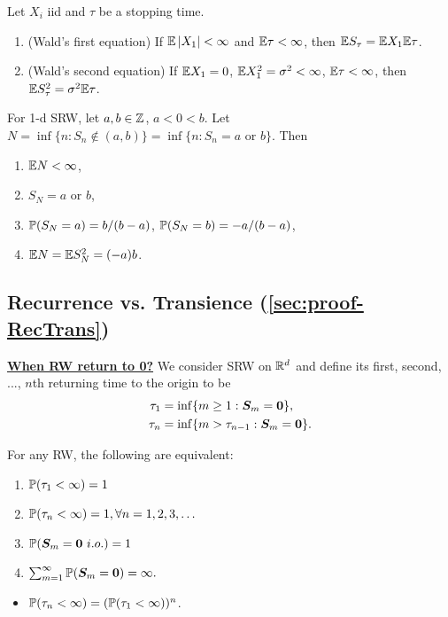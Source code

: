 \documentclass[10pt,a4paper]{article}
\begin{document}
\begin{thmbox}
	\begin{theorem}\label{thm:WaldEq}
		
	Let $X_i$ iid and $\tau$ be a stopping time. 
	\begin{enumerate}
		\item (Wald's first equation)
		If $\mathbb E \left\lvert X_1\right\rvert< \infty $ and $\mathbb E \tau < \infty $, then $\mathbb E S_{\tau}=\mathbb E X_1 \mathbb E \tau$.     
		\item (Wald's second equation) If $\mathbb E X_1=0$, $\mathbb E X_1^2=\sigma^2<\infty$, $\mathbb E \tau < \infty $, then $\mathbb E S_{\tau}^2=\sigma^2 \mathbb E \tau$.    
	\end{enumerate}
	\end{theorem}
\end{thmbox}

\begin{exbox}
\begin{example}\label{eg:1dSRW}
	For 1-d SRW, let $a,b\in\mathbb Z$, $a<0<b$. Let $N=\inf \{n: S_n\notin (a,b)\}=\inf\{n:S_n=a \text{ or } b\}$. Then 
	\begin{enumerate}
		\item $\mathbb E N <\infty $,
		\item $S_N=a$ or $b$,
		\item $\mathbb P (S_N=a)=b/(b-a)$, $\mathbb P(S_N=b)=-a/(b-a)$,
		\item $\mathbb E N=\mathbb E S_N^2=(-a)b$.      
	\end{enumerate} 
\end{example}
\end{exbox}

\subsection{Recurrence vs. Transience (\ref{sec:proof-RecTrans})}\label{sec:RecTrans}
\noindent \underline{\textbf{When RW return to 0?}}
We consider SRW on $\mathbb R^d$ and define its first, second, ..., $n$th returning time to the origin to be 
\begin{align*}
	\tau_{1}&=\inf\{m\geq1:{\boldsymbol S}_{m}={\boldsymbol 0}\},\\\tau_{n}&=\inf\{m>\tau_{n-1}:{\boldsymbol S}_{m}={\boldsymbol 0}\}.
\end{align*}

\begin{thmbox}
	\begin{theorem}\label{thm:returnTimeRW}
		For any RW, the following are equivalent:
		\begin{enumerate}[label=(\roman*)]
			\item $\mathbb P(\tau_{1}<\infty)=1$ 
			\item $\mathbb P(\tau_{n}<\infty)=1, \forall n=1,2,3,\ldots$
			\item $\bbP(\S_{m}=\0 \ i.o.)=1$
			\item $\sum_{m=1}^{\infty}\mathbb P({\boldsymbol S}_{m}={\boldsymbol 0})=\infty.$ 
		\end{enumerate}
	\end{theorem}
\end{thmbox}
\begin{itemize}
	\item $\mathbb P(\tau_n<\infty)=(\mathbb P(\tau_1<\infty))^n$. 
\end{itemize}
\end{document}

